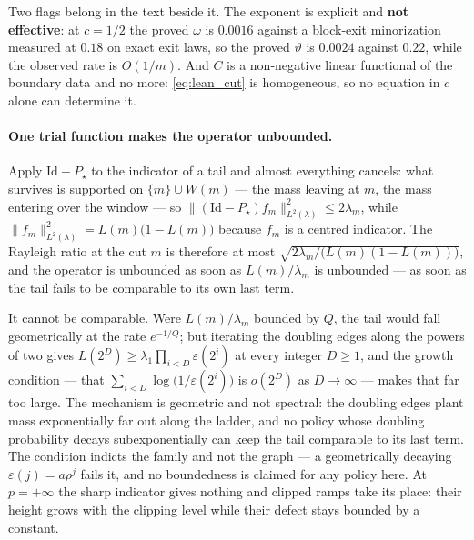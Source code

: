 Two flags belong in the text beside it. The exponent is explicit and \textbf{not effective}: at
$c=1/2$ the proved $\omega$ is $0.0016$ against a block-exit minorization measured at $0.18$ on
exact exit laws, so the proved $\vartheta$ is $0.0024$ against $0.22$, while the observed rate
is $O(1/m)$. And $C$ is a non-negative linear functional of the boundary data and no more:
\eqref{eq:lean_cut} is homogeneous, so no equation in $c$ alone can determine it.

\paragraph{One trial function makes the operator unbounded.}
Apply $\mathrm{Id}-P_\star$ to the indicator of a tail and almost everything cancels: what
survives is supported on $\{m\}\cup W(m)$ --- the mass leaving at $m$, the mass entering over
the window --- so $\|(\mathrm{Id}-P_\star)f_m\|^2_{L^2(\lambda)}\leq2\lambda_m$, while
$\|f_m\|^2_{L^2(\lambda)}=L(m)\bigl(1-L(m)\bigr)$ because $f_m$ is a centred indicator. The
Rayleigh ratio at the cut $m$ is therefore at most
$\sqrt{2\lambda_m/\bigl(L(m)(1-L(m))\bigr)}$, and the operator is unbounded as soon as
$L(m)/\lambda_m$ is unbounded --- as soon as the tail fails to be comparable to its own last
term.

It cannot be comparable. Were $L(m)/\lambda_m$ bounded by $Q$, the tail would fall geometrically
at the rate $e^{-1/Q}$; but iterating the doubling edges along the powers of two gives
$L(2^D)\geq\lambda_1\prod_{i<D}\varepsilon(2^i)$ at every integer $D\geq1$, and the growth
condition --- that $\sum_{i<D}\log\bigl(1/\varepsilon(2^i)\bigr)$ is $o(2^D)$ as
$D\rightarrow\infty$ --- makes that far too large. The mechanism is
geometric and not spectral: the doubling edges plant mass exponentially far out along the
ladder, and no policy whose doubling probability decays subexponentially can keep the tail
comparable to its last term. The condition indicts the family and not the graph --- a
geometrically decaying $\varepsilon(j)=a\rho^j$ fails it, and no boundedness is claimed for any
policy here. At $p=+\infty$ the sharp indicator gives nothing and clipped ramps take its place:
their height grows with the clipping level while their defect stays bounded by a constant.

